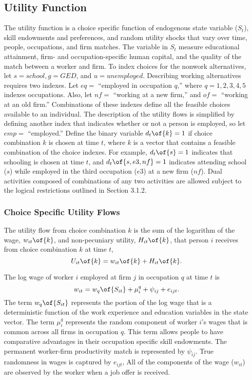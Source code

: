 \documentclass[12pt]{article}
\theoremstyle{definition}
\begin{document}
\subsection{Utility Function}

The utility function is a choice specific function of endogenous state variable ($S_t$), skill endowments and preferences, and random utility shocks that vary over time, people, occupations, and firm matches. The variable in $S_t$ measure educational attainment, firm- and occupation-specific human capital, and the quality of the match between a worker and firm. To index choices for the nonwork alternatives, let $s = school, g = GED$, and $u = unemployed$. Describing working alternatives requires two indexes. Let $eq =$ ``employed in occupation $q$,'' where $q = 1, 2, 3, 4, 5$ indexes occupations. Also, let $nf =$ ``working at a new firm,'' and $of =$ ``working at an old firm.'' Combinations of these indexes define all the feasible choices available to an individual. The description of the utility flows is simplified by defining another index that indicates whether or not a person is employed, so let $emp =$ ``employed.'' Define the binary variable $d_t\of{k}=1$ if choice combination $k$ is chosen at time $t$, where $k$ is a vector that contains a feasible combination of the choice indexes. For example, $d_t\of{s} = 1$ indicates that schooling is chosen at time $t$, and $d_t\of{s, e3, nf} = 1$ indicates attending school ($s$) while employed in the third occupation ($e3$) at a new firm ($nf$). Dual activities composed of combinations of any two activities are allowed subject to the logical restrictions outlined in Section 3.1.2.

\subsubsection{Choice Specific Utility Flows}

The utility flow from choice combination $k$ is the sum of the logarithm of the wage, $w_{it}\of{k}$, and non-pecuniary utility, $H_{it}\of{k}$, that person $i$ receives from choice combination $k$ at time $t$,
\begin{equation}
    \label{1}
    U_{it}\of{k} = w_{it}\of{k} + H_{it}\of{k}.
\end{equation}

The log wage of worker $i$ employed at firm $j$ in occupation $q$ at time $t$ is 
\begin{equation}
    \label{2}
    w_{it} = w_q\of{S_{it}} + \mu_i^q + \psi_{ij} + e_{ijt}.
\end{equation}
The term $w_q\of{S_{it}}$ represents the portion of the log wage that is a deterministic function of the work experience and education variables in the state vector. The term $\mu_i^q$ represents the random component of worker $i$'s wages that is common across all firms in occupation $q$. This term allows people to have comparative advantages in their occupation specific skill endowments. The permanent worker-firm productivity match is represented by $\psi_{ij}$. True randomness in wages is captured by $e_{ijt}$, All of the components of the wage ($w_{it}$) are observed by the worker when a job offer is received. 
\end{document}

